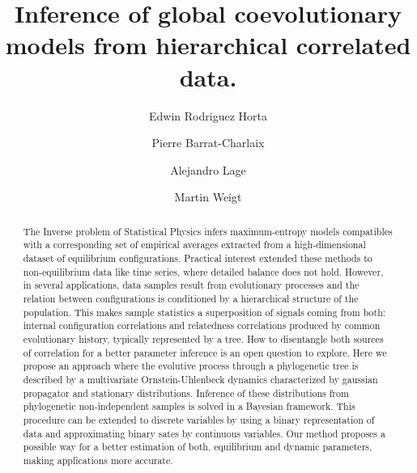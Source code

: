 \documentclass[preprint,amsmath,amssymb,superscriptaddress,showpacs,pre]{revtex4-1}
\begin{document}
\title{Inference of global coevolutionary models from hierarchical correlated data.}
\date{}

\author{Edwin Rodriguez Horta} 
%
\author{Pierre Barrat-Charlaix} 
%
\author{Alejandro Lage} 
%
\author{Martin Weigt} 




\begin{abstract}
	The Inverse problem of Statistical Physics infers maximum-entropy  models  compatibles with a corresponding set of empirical averages extracted from a high-dimensional dataset of equilibrium configurations. Practical interest extended these methods to non-equilibrium data  like  time series, where detailed balance does not hold. However, in several applications, data samples  result from evolutionary processes and the relation between configurations is conditioned by a hierarchical structure of the population. This makes sample statistics a superposition of  signals coming from both: internal configuration correlations and relatedness correlations produced by common evolutionary  history, typically represented by a tree. How to disentangle both sources of correlation for a better parameter inference is an open question to explore. Here we propose an approach  where the  evolutive process through a phylogenetic tree is described by  a  multivariate Ornstein-Uhlenbeck dynamics characterized by  gaussian propagator and stationary distributions. Inference of these distributions from  phylogenetic non-independent samples is solved in a Bayesian framework. This procedure can be  extended to discrete variables by using a binary representation of data and approximating  binary sates by continuous variables. Our method proposes a possible way for  a better estimation of both, equilibrium and dynamic parameters, making  applications more accurate. 
\end{abstract}


\maketitle
\end{document}
